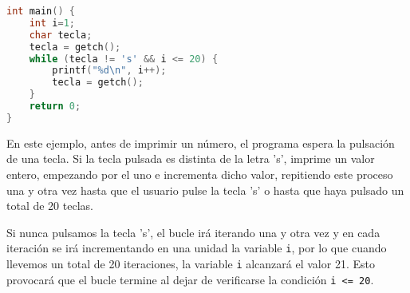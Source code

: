 {\begin{Ejemplo}
\begin{lstlisting}[language=C]
int main() {
    int i=1;
    char tecla;
    tecla = getch();
    while (tecla != 's' && i <= 20) {
        printf("%d\n", i++);
        tecla = getch();
    }
    return 0;
}
\end{lstlisting}
\Explicacion
En este ejemplo, antes de imprimir un número, el programa espera la pulsación de una tecla. Si la tecla pulsada es distinta de la letra 's', imprime un valor entero, empezando por el uno e incrementa dicho valor, repitiendo este proceso una y otra vez hasta que el usuario pulse la tecla 's' o hasta que haya pulsado un total de 20 teclas.

Si nunca pulsamos la tecla 's', el bucle irá iterando una y otra vez y en cada iteración se irá incrementando en una unidad la variable \texttt{i}, por lo que cuando llevemos un total de 20 iteraciones, la variable \texttt{i} alcanzará el valor 21. Esto provocará que el bucle termine al dejar de verificarse la condición \texttt{i <= 20}.
\end{Ejemplo}
}
